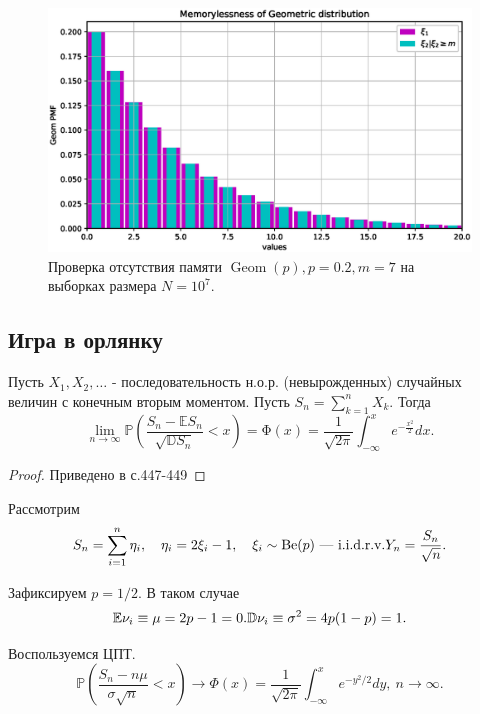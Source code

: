 \documentclass[11pt]{report}
\DeclareMathOperator{\Geom}{Geom}
\begin{document}
\begin{figure}[H]
    \centering
    \includegraphics[width=0.9\linewidth]{geom-memo.eps}
    \caption{Проверка отсутствия памяти $\Geom(p), p=0.2, m=7$ на выборках размера $N=10^7$.}
    \label{fig:geom-memo}
\end{figure}

\subsection{Игра в орлянку}\label{ss:coin-toss}

 \begin{theorem}
Пусть $X_1,X_2,\dots$ - последовательность н.о.р. (невырожденных) случайных величин с конечным вторым моментом.
Пусть $S_n = \sum_{k=1}^{n}X_k$. Тогда
$$
\lim_{n\to\infty}\mathbb{P}\left( \dfrac{S_n-\mathbb{E}S_n}{\sqrt{\mathbb{D}S_n}} < x \right) = \mathrm{\Phi}(x) = \dfrac{1}{\sqrt{2\pi}} \int_{-\infty}^x e^{-\frac{x^2}{2}}dx.
$$
\end{theorem}
\begin{proof} Приведено в \cite{shiryaev-1} с.447-449 \end{proof}

Рассмотрим
$$
S_n = \sum^{n}_{i=1} \eta_i,\quad \eta_i = 2\xi_i-1,\quad \xi_i \sim \operatorname{Be}(p) \text{ --- i.i.d.r.v.}\\
Y_n = \dfrac{S_n}{\sqrt{n}}.
$$

Зафиксируем $p=1/2$. В таком случае
$$
\mathbb{E}\nu_i \equiv \mu = 2p-1 = 0.\\
\mathbb{D}\nu_i \equiv \sigma^2 = 4p(1-p) = 1.
$$

Воспользуемся ЦПТ.
$$
\mathbb{P}\left( \dfrac{S_n - n\mu}{\sigma\sqrt{n}} < x \right) \to \Phi(x)=\dfrac{1}{\sqrt{2\pi}}\int_{-\infty}^{x}e^{-y^2/2}dy,~n\to\infty.
$$
\end{document}
